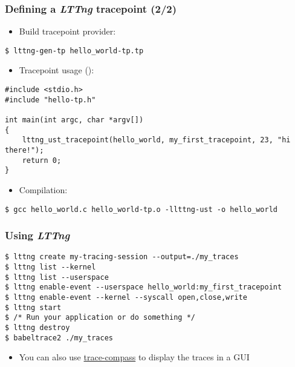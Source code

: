 \begin{frame}[fragile]
  \frametitle{Defining a {\em LTTng} tracepoint (2/2)}
  \begin{itemize}
    \item Build tracepoint provider:
  \end{itemize}
  \begin{block}{}
    \begin{verbatim}
$ lttng-gen-tp hello_world-tp.tp
   \end{verbatim}
  \end{block}
  \begin{itemize}
    \item Tracepoint usage ():
  \end{itemize}
  \begin{block}{}
    \begin{verbatim}
#include <stdio.h>
#include "hello-tp.h"

int main(int argc, char *argv[])
{
    lttng_ust_tracepoint(hello_world, my_first_tracepoint, 23, "hi there!");
    return 0;
}
   \end{verbatim}
  \end{block}
  \begin{itemize}
    \item Compilation:
  \end{itemize}
  \begin{block}{}
    \begin{verbatim}
$ gcc hello_world.c hello_world-tp.o -llttng-ust -o hello_world
   \end{verbatim}
  \end{block}
\end{frame}

\begin{frame}[fragile]
  \frametitle{Using {\em LTTng}}
  \begin{block}{}
    \begin{verbatim}
$ lttng create my-tracing-session --output=./my_traces
$ lttng list --kernel
$ lttng list --userspace
$ lttng enable-event --userspace hello_world:my_first_tracepoint
$ lttng enable-event --kernel --syscall open,close,write
$ lttng start
$ /* Run your application or do something */
$ lttng destroy
$ babeltrace2 ./my_traces
   \end{verbatim}
  \end{block}
  \begin{itemize}
    \item You can also use
    \href{https://eclipse.dev/tracecompass/trace-compass}{trace-compass}
    to display the traces in a GUI
  \end{itemize}
\end{frame}

